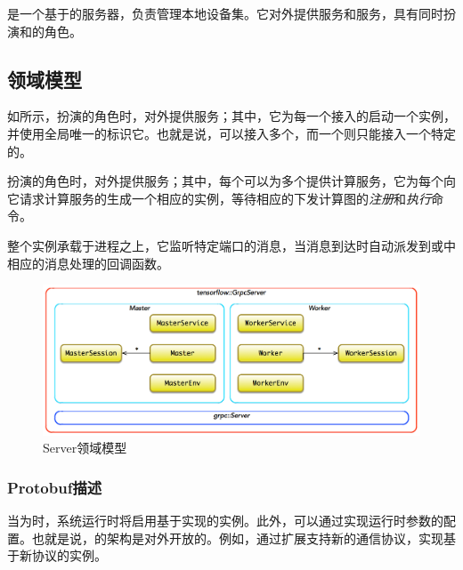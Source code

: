 \begin{content}

是一个基于的服务器，负责管理本地设备集。它对外提供服务和服务，具有同时扮演和的角色。

\subsection{领域模型}

如所示，扮演的角色时，对外提供服务；其中，它为每一个接入的启动一个实例，并使用全局唯一的标识它。也就是说，可以接入多个，而一个则只能接入一个特定的。

扮演的角色时，对外提供服务；其中，每个可以为多个提供计算服务，它为每个向它请求计算服务的生成一个相应的实例，等待相应的下发计算图的\emph{注册}和\emph{执行}命令。

整个实例承载于进程之上，它监听特定端口的消息，当消息到达时自动派发到或中相应的消息处理的回调函数。

\begin{figure}[H]
\centering
\includegraphics[width=1.0\textwidth]{figures/cc-server-model.png}
\caption{Server领域模型}
 \label{fig:cc-server-model}
\end{figure}

\subsubsection{Protobuf描述}

当为时，系统运行时将启用基于实现的实例。此外，可以通过实现运行时参数的配置。也就是说，\tf{}的架构是对外开放的。例如，通过扩展支持新的通信协议，实现基于新协议的实例。


\end{content}
